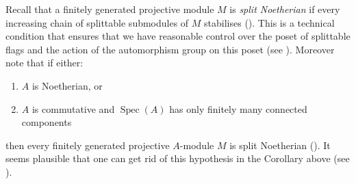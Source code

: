 \documentclass[12pt, reqno]{amsart}
\theoremstyle{plain}
\theoremstyle{definition}
\begin{document}
Recall that a finitely generated projective module $M$ is \textit{split Noetherian} if every increasing chain of splittable submodules of $M$ stabilises (\cite[Definition 1.1]{ClausenOrsnesJansen}). This is a technical condition that ensures that we have reasonable control over the poset of splittable flags and the action of the automorphism group on this poset (see \cite[Lemma 5.4]{ClausenOrsnesJansen}). Moreover note that if either:
\begin{enumerate}
\item $A$ is Noetherian, or
\item $A$ is commutative and $\operatorname{Spec}(A)$ has only finitely many connected components
\end{enumerate}
then every finitely generated projective $A$-module $M$ is split Noetherian (\cite[Lemma 5.5]{ClausenOrsnesJansen}). It seems plausible that one can get rid of this hypothesis in the Corollary above (see ).
\end{document}
